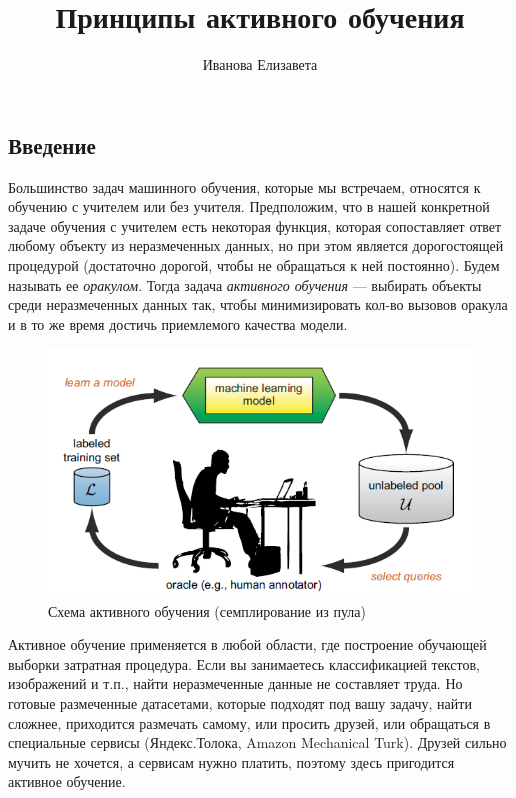 \documentclass[specialist, 12pt, href]{article}
\title{Принципы активного обучения}
\author{Иванова Елизавета}
\date{}
\begin{document}
\maketitle

\subsection{Введение}

Большинство задач машинного обучения, которые мы встречаем, относятся к
обучению с учителем или без учителя.
Предположим, что в нашей конкретной задаче обучения с учителем есть
некоторая функция, которая сопоставляет ответ любому объекту из
неразмеченных данных, но при этом является дорогостоящей процедурой
(достаточно дорогой, чтобы не обращаться к ней постоянно). Будем
называть ее \emph{оракулом}. Тогда задача \emph{активного обучения} ---
выбирать объекты среди неразмеченных данных так, чтобы минимизировать кол-во вызовов
оракула и в то же время достичь приемлемого качества модели.

\begin{figure}[htbp]
\centering
\includegraphics[width=5in]{img/al.png}
\caption{Схема активного обучения (семплирование из пула)}
\end{figure}

Активное обучение применяется в любой области, где построение обучающей
выборки затратная процедура. Если вы занимаетесь классификацией текстов,
изображений и т.п., найти неразмеченные данные не составляет труда. Но
готовые размеченные датасетами, которые подходят под вашу задачу, найти
сложнее, приходится размечать самому, или просить друзей, или обращаться
в специальные сервисы (Яндекс.Толока, Amazon Mechanical Turk). Друзей
сильно мучить не хочется, а сервисам нужно платить, поэтому здесь
пригодится активное обучение.
\end{document}
